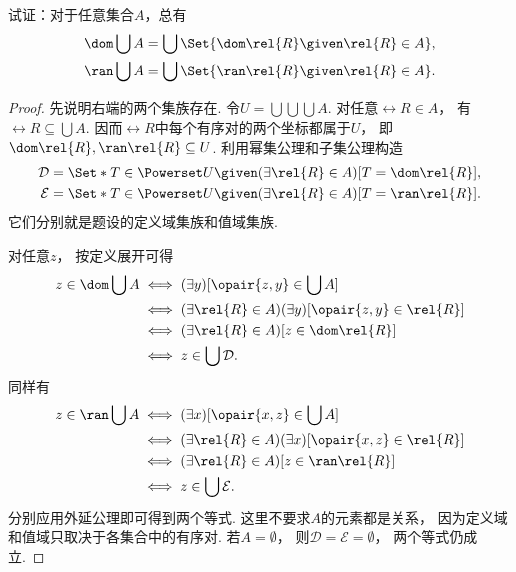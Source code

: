 \begin{example}
    试证：对于任意集合\(A\)，总有
    \begin{gather}
        \dom\bigcup A = \bigcup\Set{ \dom\rel{R} \given \rel{R} \in A }, \\
        \ran\bigcup A = \bigcup\Set{ \ran\rel{R} \given \rel{R} \in A }.
    \end{gather}
    \begin{proof}
        先说明右端的两个集族存在.
        令\(U=\bigcup\bigcup\bigcup A\).
        对任意\(\rel{R}\in A\)，
        有\(\rel{R}\subseteq\bigcup A\).
        因而\(\rel{R}\)中每个有序对的两个坐标都属于\(U\)，
        即\(\dom\rel{R},\ran\rel{R}\subseteq U\).
        利用幂集公理和子集公理构造
        \begin{align*}
            \mathcal{D}
            &=\Set*{T\in\Powerset U
            \given(\exists\rel{R}\in A)[T=\dom\rel{R}]}, \\
            \mathcal{E}
            &=\Set*{T\in\Powerset U
            \given(\exists\rel{R}\in A)[T=\ran\rel{R}]}.
        \end{align*}
        它们分别就是题设的定义域集族和值域集族.

        对任意\(z\)，
        按定义展开可得
        \begin{align*}
            z\in\dom\bigcup A
            &\iff(\exists y)[\opair{z,y}\in\bigcup A] \\
            &\iff(\exists\rel{R}\in A)(\exists y)[\opair{z,y}\in\rel{R}] \\
            &\iff(\exists\rel{R}\in A)[z\in\dom\rel{R}] \\
            &\iff z\in\bigcup\mathcal{D}.
        \end{align*}
        同样有
        \begin{align*}
            z\in\ran\bigcup A
            &\iff(\exists x)[\opair{x,z}\in\bigcup A] \\
            &\iff(\exists\rel{R}\in A)(\exists x)[\opair{x,z}\in\rel{R}] \\
            &\iff(\exists\rel{R}\in A)[z\in\ran\rel{R}] \\
            &\iff z\in\bigcup\mathcal{E}.
        \end{align*}
        分别应用外延公理即可得到两个等式.
        这里不要求\(A\)的元素都是关系，
        因为定义域和值域只取决于各集合中的有序对.
        若\(A=\emptyset\)，
        则\(\mathcal{D}=\mathcal{E}=\emptyset\)，
        两个等式仍成立.
    \end{proof}
\end{example}


